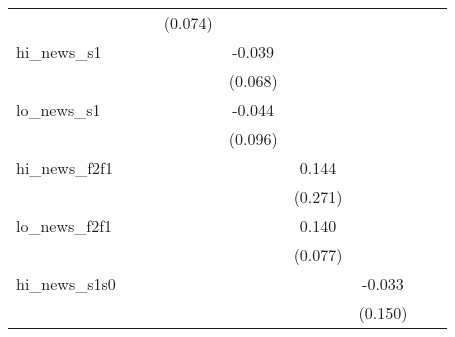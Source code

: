 {\begin{tabular}{l*{8}{c}}
            &                     &                     &     (0.074)         &                     &                     &                     &                     &                     \\
\addlinespace
hi\_news\_s1  &                     &                     &                     &      -0.039         &                     &                     &                     &                     \\
            &                     &                     &                     &     (0.068)         &                     &                     &                     &                     \\
\addlinespace
lo\_news\_s1  &                     &                     &                     &      -0.044         &                     &                     &                     &                     \\
            &                     &                     &                     &     (0.096)         &                     &                     &                     &                     \\
\addlinespace
hi\_news\_f2f1&                     &                     &                     &                     &       0.144         &                     &                     &                     \\
            &                     &                     &                     &                     &     (0.271)         &                     &                     &                     \\
\addlinespace
lo\_news\_f2f1&                     &                     &                     &                     &       0.140\sym{*}  &                     &                     &                     \\
            &                     &                     &                     &                     &     (0.077)         &                     &                     &                     \\
\addlinespace
hi\_news\_s1s0&                     &                     &                     &                     &                     &      -0.033         &                     &                     \\
            &                     &                     &                     &                     &                     &     (0.150)         &                     &                     \\

\end{tabular}}
